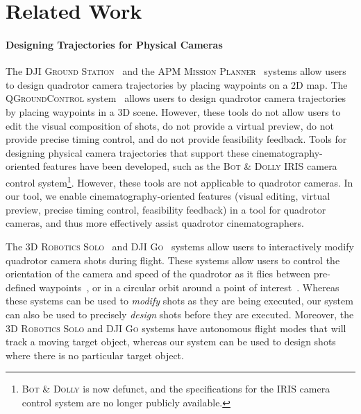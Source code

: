 \section{Related Work}

\paragraph{Designing Trajectories for Physical Cameras}
The \textsc{DJI Ground Station}~\cite{dji:2015} and the \textsc{APM Mission Planner}~\cite{apm:2015} systems allow users to design quadrotor camera trajectories by placing waypoints on a 2D map.
The \textsc{QGroundControl} system~\cite{meier:2012} allows users to design quadrotor camera trajectories by placing waypoints in a 3D scene.
However, these tools do not allow users to edit the visual composition of shots, do not provide a virtual preview, do not provide precise timing control, and do not provide feasibility feedback.
Tools for designing physical camera trajectories that support these cinematography-oriented features have been developed, such as the \textsc{Bot \& Dolly IRIS} camera control system\footnote{\textsc{Bot \& Dolly} is now defunct, and the specifications for the \textsc{IRIS} camera control system are no longer publicly available.}.
However, these tools are not applicable to quadrotor cameras.
In our tool, we enable cinematography-oriented features (visual editing, virtual preview, precise timing control, feasibility feedback) in a tool for quadrotor cameras, and thus more effectively assist quadrotor cinematographers.

The \textsc{3D Robotics Solo}~\cite{3drobotics:2015} and \textsc{DJI Go}~\cite{dji:2015a} systems allow users to interactively modify quadrotor camera shots during flight.
These systems allow users to control the orientation of the camera and speed of the quadrotor as it flies between pre-defined waypoints~\cite{3drobotics:2015}, or in a circular orbit around a point of interest~\cite{dji:2015a}.
Whereas these systems can be used to \emph{modify} shots as they are being executed, our system can also be used to precisely \emph{design} shots before they are executed.
Moreover, the \textsc{3D Robotics Solo} and \textsc{DJI Go} systems have autonomous flight modes that will track a moving target object, whereas our system can be used to design shots where there is no particular target object.

